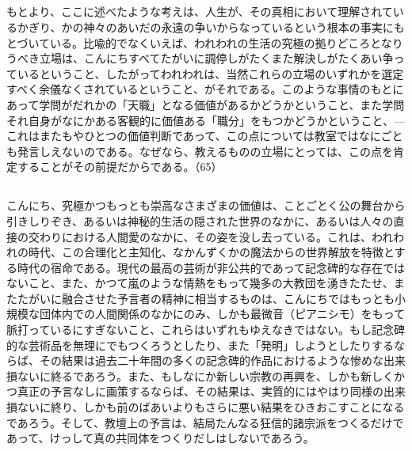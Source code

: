 \subsection{}


もとより、ここに述べたような考えは、人生が、その真相において理解されているかぎり、かの神々のあいだの永遠の争いからなっているという根本の事実にもとづいている。比喩的でなくいえば、われわれの生活の究極の拠りどころとなりうべき立場は、こんにちすべてたがいに調停しがたくまた解決しがたくあい争っているということ、したがってわれわれは、当然これらの立場のいずれかを選定すべく余儀なくされているということ、がそれである。このような事情のもとにあって学問がだれかの「天職」となる価値があるかどうかということ、また学問それ自身がなにかある客観的に価値ある「職分」をもつかどうかということ、{\——}これはまたもやひとつの価値判断であって、この点については教室ではなにごとも発言しえないのである。なぜなら、教えるものの立場にとっては、この点を肯定することがその前提だからである。（65）

\subsection{}


こんにち、究極かつもっとも崇高なさまざまの価値は、ことごとく公の舞台から引きしりぞき、あるいは神秘的生活の隠された世界のなかに、あるいは人々の直接の交わりにおける人間愛のなかに、その姿を没し去っている。これは、われわれの時代、この合理化と主知化、なかんずくかの魔法からの世界解放を特徴とする時代の宿命である。現代の最高の芸術が非公共的であって記念碑的な存在ではないこと、また、かつて嵐のような情熱をもって幾多の大教団を湧きたたせ、またたがいに融合させた予言者の精神に相当するものは、こんにちではもっとも小規模な団体内での人間関係のなかにのみ、しかも最微音（ピアニシモ）をもって脈打っているにすぎないこと、これらはいずれもゆえなきではない。もし記念碑的な芸術品を無理にでもつくろうとしたり、また「発明」しようとしたりするならば、その結果は過去二十年間の多くの記念碑的作品におけるような惨めな出来損ないに終るであろう。また、もしなにか新しい宗教の再興を、しかも新しくかつ真正の予言なしに画策するならば、その結果は、実質的にはやはり同様の出来損ないに終り、しかも前のばあいよりもさらに悪い結果をひきおこすことになるであろう。そして、教壇上の予言は、結局たんなる狂信的諸宗派をつくるだけであって、けっして真の共同体をつくりだしはしないであろう。

\subsection{}



